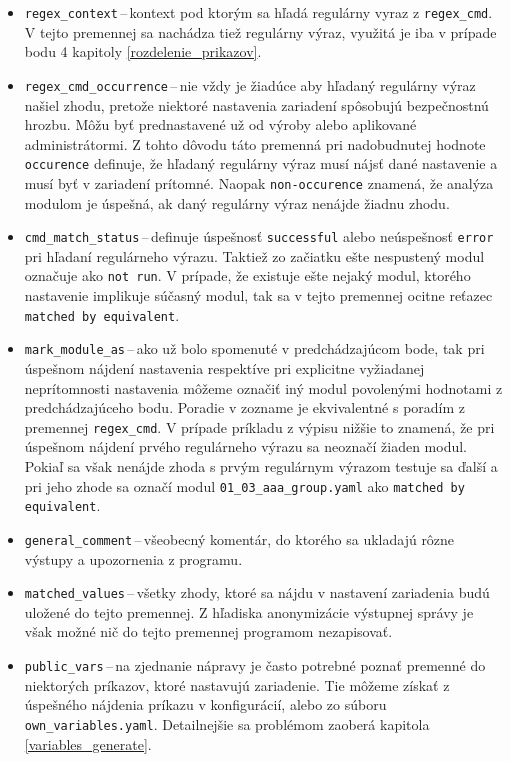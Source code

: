 \begin{itemize}
	\item \texttt{regex\_context}\,--\,kontext pod ktorým sa hľadá regulárny vyraz z \texttt{regex\_cmd}. V tejto premennej sa nachádza tiež regulárny výraz, využitá je iba v prípade bodu 4 kapitoly \ref{rozdelenie_prikazov}.
	\item \texttt{regex\_cmd\_occurrence}\,--\,nie vždy je žiadúce aby hľadaný regulárny výraz našiel zhodu, pretože niektoré nastavenia zariadení spôsobujú bezpečnostnú hrozbu. Môžu byť prednastavené už od výroby alebo aplikované administrátormi. Z tohto dôvodu táto premenná pri nadobudnutej hodnote \texttt{occurence} definuje, že hľadaný regulárny výraz musí nájsť dané nastavenie a musí byť v zariadení prítomné. Naopak \texttt{non-occurence} znamená, že analýza modulom je úspešná, ak daný regulárny výraz nenájde žiadnu zhodu. 
	\item \texttt{cmd\_match\_status}\,--\,definuje úspešnosť \texttt{successful} alebo neúspešnosť \texttt{error} pri hľadaní regulárneho výrazu. Taktiež zo začiatku ešte nespustený modul označuje ako \texttt{not run}. V prípade, že existuje ešte nejaký modul, ktorého nastavenie implikuje súčasný modul, tak sa v tejto premennej ocitne reťazec \texttt{matched by equivalent}.
	\item \texttt{mark\_module\_as}\,--\,ako už bolo spomenuté v predchádzajúcom bode, tak pri úspešnom nájdení nastavenia respektíve pri explicitne vyžiadanej neprítomnosti nastavenia môžeme označiť iný modul povolenými hodnotami z predchádzajúceho bodu. Poradie v zozname je ekvivalentné  s poradím z premennej \texttt{regex\_cmd}. V prípade príkladu z výpisu nižšie to znamená, že pri úspešnom nájdení prvého regulárneho výrazu sa neoznačí žiaden modul. Pokiaľ sa však nenájde zhoda s prvým regulárnym výrazom testuje sa ďalší a pri jeho zhode sa označí modul \texttt{01\_03\_aaa\_group.yaml} ako \texttt{matched by equivalent}.
	\item \texttt{general\_comment}\,--\,všeobecný komentár, do ktorého sa ukladajú rôzne výstupy a upozornenia z programu.
	\item \texttt{matched\_values}\,--\,všetky zhody, ktoré sa nájdu v nastavení zariadenia budú uložené do tejto premennej. Z hľadiska anonymizácie výstupnej správy je však možné nič do tejto premennej programom nezapisovať.
	\item \texttt{public\_vars}\,--\,na zjednanie nápravy je často potrebné poznať premenné do niektorých príkazov, ktoré nastavujú zariadenie. Tie môžeme získať z úspešného nájdenia príkazu v konfigurácií, alebo zo súboru \texttt{own\_variables.yaml}. Detailnejšie sa problémom zaoberá kapitola \ref{variables_generate}.

\end{itemize}
